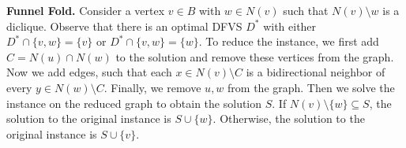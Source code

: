 
\textbf{Funnel Fold.}
Consider a vertex $v \in B$ with $w \in N(v)$ such that $N(v) \setminus w$ is a diclique.
Observe that there is an optimal DFVS $D^*$ with either $D^* \cap \{v,w\} = \{v\}$ or $D^* \cap \{v,w\} = \{w\}$.
To reduce the instance, we first add $C = N(u)\cap N(w)$ to the solution and remove these vertices from the graph.
Now we add edges, such that each $x \in N(v) \setminus C$ is a bidirectional neighbor of every $y \in N(w) \setminus C$.
Finally, we remove $u, w$ from the graph.
Then we solve the instance on the reduced graph to obtain the solution $S$.
If $N(v) \setminus \{w\} \subseteq S$, the solution to the original instance is $S \cup \{w\}$.
Otherwise, the solution to the original instance is $S \cup \{v\}$.